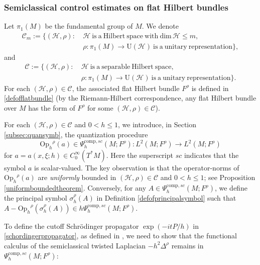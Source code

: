 \documentclass[11pt,oneside,reqno]{amsart}
\newcommand\Oph{\ensuremath{\mathrm{Op}_h}}
\theoremstyle{definition}
\numberwithin{equation}{section}
\theoremstyle{plain}
\begin{document}
\subsubsection{Semiclassical control estimates on flat Hilbert bundles}

Let $\pi_1(M)$ be the fundamental group of $M$. We denote
\begin{equation}
\begin{aligned}
    \mathcal{C}_m := \{(\mathcal{H},\rho): \ &\mathcal{H} \mathrm{\ is\ a\ Hilbert\ space\ with}\ \mathrm{dim}\,\mathcal{H}\leq m,  \\
    & \rho:\pi_1(M) \rightarrow \mathrm{U}(\mathcal{H}) \mathrm{\ is\ a\ unitary\ representation}\},
\end{aligned}
\end{equation}
and
\begin{equation}
\begin{aligned}
    \mathcal{C} := \{(\mathcal{H},\rho): \ & \mathcal{H} \mathrm{\ is\ a\ separable\  Hilbert\ space},  
    \\
    &\rho:\pi_1(M) \rightarrow \mathrm{U}(\mathcal{H}) \mathrm{\ is\ a\ unitary\ representation}\}.
\end{aligned}
\end{equation}
For each $(\mathcal{H},\rho)\in \mathcal{C}$, the associated flat Hilbert bundle $F^\rho$ is defined in \eqref{defofflatbundle} (by the Riemann-Hilbert correspondence, any flat Hilbert bundle over $M$ has the form of $F^\rho$ for some $(\mathcal{H},\rho)\in \mathcal{C}$). 

For each $(\mathcal{H},\rho)\in \mathcal{C}$ and $0<h \leq 1$, we introduce, in Section \ref{subsec:quansymb}, the quantization procedure  
\begin{equation*}
    \Oph^{\rho}(a)\in \Psi^{\mathrm{comp},sc}_h(M;F^\rho): L^2(M;F^\rho)\to L^2(M;F^{\rho})
\end{equation*}
for $a=a(x,\xi;h) \in C_{0}^{\infty}(T^*M)$. Here the superscript $sc$ indicates that the symbol $a$ is scalar-valued. The key observation is that the operator-norms of $\Oph^{\rho}(a)$ are \emph{uniformly} bounded in $(\mathcal{H},\rho)\in \mathcal{C}$ and $0<h\leq 1$; see Proposition \ref{uniformboundedtheorem}. Conversely, for any $A \in \Psi^{\mathrm{comp},sc}_h(M;F^\rho)$, we define the principal symbol $\sigma^{\rho}_h(A)$ in Definition \ref{defofprincipalsymbol} such that $A-\Oph^{\rho}(\sigma^{\rho}_h(A))\in h\Psi^{\mathrm{comp},sc}_h(M;F^\rho)$.

To define the cutoff Schrödinger propagator $\exp\left(-itP/h\right)$ in \eqref{schordingerpropagator}, as defined in \cite[(2.13)]{dyatlov2018semiclassical}, we need to show that the functional calculus of the semiclassical twisted Laplacian $-h^2\Delta^{\rho}$ remains in $\Psi^{\mathrm{comp},sc}_h(M;F^\rho)$:
\end{document}
